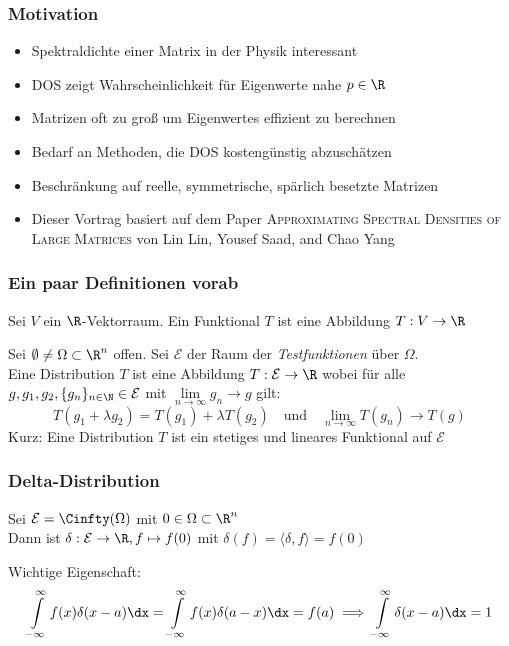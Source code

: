 \begin{frame}
    \frametitle{Motivation}
    \begin{itemize}
        \pause
        \item Spektraldichte einer Matrix in der Physik interessant
        \pause
        \item DOS zeigt Wahrscheinlichkeit für Eigenwerte nahe $p \in \R$
        \pause
        \item Matrizen oft zu groß um Eigenwertes effizient zu berechnen
        \pause
        \item Bedarf an Methoden, die DOS kostengünstig abzuschätzen
        \pause
        \item Beschränkung auf reelle, symmetrische, spärlich besetzte Matrizen
        \pause
        \item Dieser Vortrag basiert auf dem Paper \textsc{Approximating Spectral Densities of Large Matrices} von Lin Lin, Yousef Saad, and Chao Yang 
    \end{itemize}
\end{frame}

\begin{frame}
    \frametitle{Ein paar Definitionen vorab}
    \pause
    \begin{definition}[Funktional]
        Sei $V$ ein $\R$-Vektorraum. Ein Funktional $T$ ist eine Abbildung $T: V \to \R$
    \end{definition}
    \pause
    \begin{definition}[Distribution]
        Sei $\emptyset \neq \Omega \subset \R^n$ offen. Sei $\mathcal{E}$ der Raum der \emph{Testfunktionen} über $\Omega$.\\
        Eine Distribution $T$ ist eine Abbildung $T: \mathcal{E} \to \R$ wobei für alle $g, g_1, g_2, \{g_n\}_{n \in \N} \in \mathcal{E}$
        mit $\lim\limits_{n \to \infty} g_n \to g$ gilt:
        $$T(g_1 + \lambda g_2) = T(g_1) + \lambda T(g_2) \quad \text{und}\quad \lim\limits_{n \to \infty} T(g_n) \to T(g)$$
        Kurz: Eine Distribution $T$ ist ein stetiges und lineares Funktional auf $\mathcal{E}$
    \end{definition}
\end{frame}

\begin{frame}
    \frametitle{Delta-Distribution}
    \pause
    \begin{definition} 
        Sei $\mathcal{E} = \Cinfty(\Omega)$ mit $0 \in \Omega \subset \R^n$\\
        Dann ist $\delta: \mathcal{E} \to \R, f \mapsto f(0)$ mit $\delta(f) = \langle \delta, f \rangle = f(0)$\\
    \end{definition}
    \pause
    \vspace{5mm}
    Wichtige Eigenschaft:
    $$\int\limits_{-\infty}^{\infty} f(x) \delta(x-a) \dx = \int\limits_{-\infty}^{\infty} f(x) \delta(a-x) \dx = f(a) \implies \int\limits_{-\infty}^{\infty} \delta(x-a) \dx = 1$$
\end{frame}

